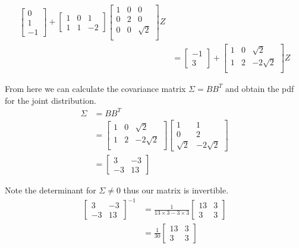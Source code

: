 \documentclass{article}
\begin{document}
\begin{align*}
\begin{bmatrix}
        0 \\ 1 \\ -1
    \end{bmatrix}
    +
    \begin{bmatrix} 1 & 0 & 1 \\ 1 & 1 & -2 \end{bmatrix}
    \begin{bmatrix}
        1 & 0 & 0 \\
        0 & 2 & 0 \\
        0 & 0 & \sqrt{2} \\
    \end{bmatrix}
    Z  \\
    &= \begin{bmatrix} -1 \\ 3 \end{bmatrix}
    +
    \begin{bmatrix}
        1 & 0 & \sqrt{2} \\
        1 & 2 & -2\sqrt{2} \\
    \end{bmatrix}
    Z
\end{align*}

From here we can calculate the covariance matrix $\Sigma = BB^T$ and obtain
the pdf for the joint distribution.
\begin{align*}
    \Sigma &= BB^T \\
    &=
    \begin{bmatrix}
        1 & 0 & \sqrt{2} \\
        1 & 2 & -2\sqrt{2} \\
    \end{bmatrix}
    \begin{bmatrix}
        1 & 1 \\
        0 & 2 \\
        \sqrt{2} & -2\sqrt{2}
    \end{bmatrix} \\
    &=
    \begin{bmatrix}
        3 & -3 \\
        -3 & 13
    \end{bmatrix}
\end{align*}

Note the determinant for $\Sigma \neq 0$ thus our matrix is invertible.
\begin{align*}
    \begin{bmatrix}
        3 & -3 \\
        -3 & 13
    \end{bmatrix}^{-1}
    &= \frac{1}{13 \times 3 - 3 \times 3}
    \begin{bmatrix}
        13 & 3 \\
        3 & 3
    \end{bmatrix} \\
    &= \frac{1}{30}
    \begin{bmatrix}
        13 & 3 \\
        3 & 3
    \end{bmatrix} \\
\end{align*}
\end{document}

